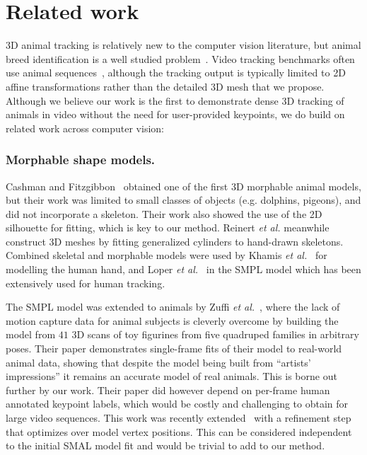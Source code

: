   \section{Related work}
  3D animal tracking is relatively new to the computer vision literature, but animal breed identification is a well studied problem~\cite{imagenet_cvpr09}. Video tracking benchmarks often use animal sequences~\cite{DAVIS2017-1st,DAVIS2017-2nd}, although the tracking output is typically limited to 2D affine transformations rather than the detailed 3D mesh that we propose.  Although we believe our work is the first to demonstrate dense 3D tracking of animals in video without the need for user-provided keypoints, we do build on related work across computer vision:
  
  \subsubsection*{Morphable shape models.}
  Cashman and Fitzgibbon~\cite{cashman2013shape} obtained one of the first 3D morphable animal models, but their work was limited to small classes of objects (e.g. dolphins, pigeons), and did not incorporate a skeleton.  Their work also showed the use of the 2D silhouette for fitting, which is key to our method. 
  Reinert {\em et al.} \cite{reinert2016animated} meanwhile construct 3D meshes by fitting generalized cylinders to hand-drawn skeletons.
  Combined skeletal and morphable models were used by Khamis {\em et al.}~\cite{hand-shape} for modelling the human hand, and Loper {\em et al.}~\cite{loper2015smpl} in the SMPL model which has been extensively used for human tracking. 
  
  The SMPL model was extended to animals by Zuffi {\em et al.}~\cite{zuffi2017menagerie}, where the lack of motion capture data for animal subjects is cleverly overcome by building the model from $41$ 3D scans of toy figurines from five quadruped families in arbitrary poses. Their paper demonstrates single-frame fits of their model to real-world animal data, showing that despite the model being built from ``artists' impressions'' it remains an accurate model of real animals. This is borne out further by our work.  Their paper did however depend on per-frame human annotated keypoint labels, which would be costly and challenging to obtain for large video sequences. This work was recently extended~\cite{zuffi_lions} with a refinement step that optimizes over model vertex positions. This can be considered independent to the initial SMAL model fit and would be trivial to add to our method.
  
